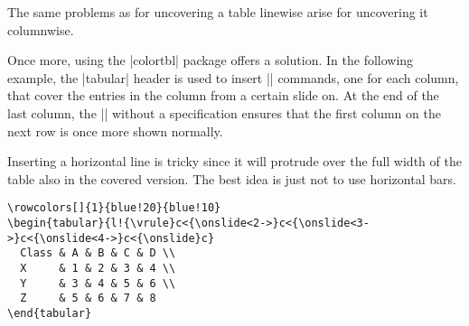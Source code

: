 The same problems as for uncovering a table linewise arise for
uncovering it columnwise.

Once more, using the |colortbl| package offers a solution. In the
following example, the |tabular| header is used to insert |\onslide|
commands, one for each column, that cover the entries in the column
from a certain slide on. At the end of the last column, the |\onslide|
without a specification ensures that the first column on the next row
is once more shown normally.

Inserting a horizontal line is tricky since it will protrude over the
full width of the table also in the covered version. The best idea is
just not to use horizontal bars.

\begin{verbatim}
\rowcolors[]{1}{blue!20}{blue!10}
\begin{tabular}{l!{\vrule}c<{\onslide<2->}c<{\onslide<3->}c<{\onslide<4->}c<{\onslide}c}
  Class & A & B & C & D \\
  X     & 1 & 2 & 3 & 4 \\
  Y     & 3 & 4 & 5 & 6 \\
  Z     & 5 & 6 & 7 & 8
\end{tabular}
\end{verbatim}



